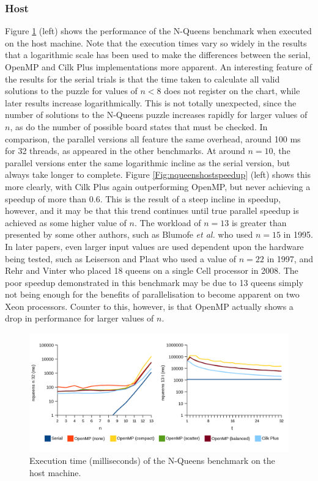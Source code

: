 \documentclass{report}
\begin{document}
\subsubsection{Host}
Figure \ref{Fig:nqueenshosttime} (left) shows the performance of the N-Queens benchmark when executed on the host machine. Note that the execution times vary so widely in the results that a logarithmic scale has been used to make the differences between the serial, OpenMP and Cilk Plus implementations more apparent. An interesting feature of the results for the serial trials is that the time taken to calculate all valid solutions to the puzzle for values of \(n<8\) does not register on the chart, while later results increase logarithmically. This is not totally unexpected, since the number of solutions to the N-Queens puzzle increases rapidly for larger values of \(n\), as do the number of possible board states that must be checked. In comparison, the parallel versions all feature the same overhead, around 100 ms for 32 threads, as appeared in the other benchmarks. At around \(n=10\), the parallel versions enter the same logarithmic incline as the serial version, but always take longer to complete. Figure \ref{Fig:nqueenshostspeedup} (left) shows this more clearly, with Cilk Plus again outperforming OpenMP, but never achieving a speedup of more than 0.6. This is the result of a steep incline in speedup, however, and it may be that this trend continues until true parallel speedup is achieved as some higher value of \(n\). The workload of \(n=13\) is greater than presented by some other authors, such as Blumofe \textit{et al.}\cite{Blumofe95} who used \(n=15\) in 1995. In later papers, even larger input values are used dependent upon the hardware being tested, such as Leiserson and Plaat\cite{Leiserson97} who used a value of \(n=22\) in 1997, and Rehr and Vinter\cite{Vinter08} who placed 18 queens on a single Cell processor in 2008. The poor speedup demonstrated in this benchmark may be due to 13 queens simply not being enough for the benefits of parallelisation to become apparent on two Xeon processors. Counter to this, however, is that OpenMP actually shows a drop in performance for larger values of \(n\).
\noindent
\begin{figure}[t!]
	\includegraphics[width=\linewidth]{../../charts/intel64/nqueens_time}
	\caption{Execution time (milliseconds) of the N-Queens benchmark on the host machine.}
	\label{Fig:nqueenshosttime}
\end{figure}
\end{document}
